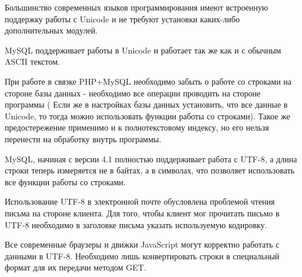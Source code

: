 Большинство современных языков программирования имеют встроенную поддержку работы с Unicode  и не требуют установки каких-либо дополнительных модулей. 



MySQL поддерживает работы в Unicode и работает так же как и с обычным ASCII текстом.

При работе в связке PHP+MySQL необходимо забыть о работе со строками на стороне базы данных - необходимо все операции проводить на стороне программы ( Если же в настройках базы данных установить, что все данные в Unicode, то тогда можно использовать функции работы со строками). Такое же предостережение применимо и к полнотекстовому индексу, но его нельзя перенести на обработку внутрь программы.


MySQL, начиная с версии 4.1 полностью поддерживает работа с UTF-8, а длина строки теперь измеряется не в байтах, а в символах, что позволяет использовать все функции работы со строками.




Использование UTF-8 в электронной почте обусловлена проблемой чтения письма на стороне клиента. Для того, чтобы клиент мог прочитать письмо в UTF-8 необходимо в заголовке письма указать используемую кодировку.



Все современные браузеры и движки JavaScript могут корректно работать с данными в UTF-8. Необходимо лишь конвертировать строки в специальный формат для их передачи методом GET.



